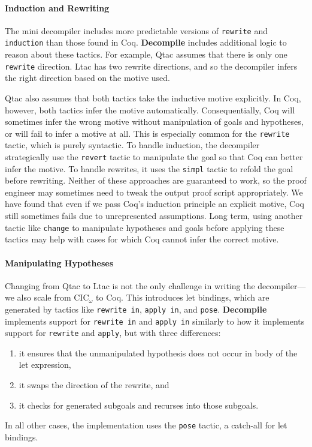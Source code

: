 \paragraph{Induction and Rewriting}
The mini decompiler includes more predictable versions of \lstinline{rewrite} and \lstinline{induction}
than those found in Coq. \textbf{Decompile} includes additional logic to reason about these tactics.
For example, Qtac assumes that there is only one \lstinline{rewrite} direction. Ltac has two rewrite directions,
and so the decompiler infers the right direction based on the motive used.

Qtac also assumes that both tactics take the inductive motive explicitly.
In Coq, however, both tactics infer the motive automatically.
Consequentially, Coq will sometimes infer the wrong motive without manipulation of goals and hypotheses,
or will fail to infer a motive at all.
This is especially common for the \lstinline{rewrite} tactic, which is purely syntactic.
To handle induction, the decompiler strategically use the \lstinline{revert} tactic to manipulate the goal
so that Coq can better infer the motive.
To handle rewrites, it uses the \lstinline{simpl} tactic to refold the goal before rewriting.
Neither of these approaches are guaranteed to work, so the proof engineer may sometimes need to tweak the output proof script appropriately.
We have found that even if we pass Coq's induction principle an explicit motive, Coq still sometimes fails due
to unrepresented assumptions.
Long term, using another tactic like \lstinline{change} to manipulate hypotheses and goals before applying these tactics
may help with cases for which Coq cannot infer the correct motive.

\paragraph{Manipulating Hypotheses}
Changing from Qtac to Ltac is not the only challenge in writing the decompiler---we also scale from CIC$_{\omega}$ to Coq.
This introduces let bindings, which are generated by tactics like \lstinline{rewrite in}, \lstinline{apply in}, and \lstinline{pose}.
\textbf{Decompile} implements support for \lstinline{rewrite in} and \lstinline{apply in} similarly to how it implements support for
\lstinline{rewrite} and \lstinline{apply}, but with three differences:

\begin{enumerate}
\item it ensures that the unmanipulated hypothesis does not occur in body of the let expression,
\item it swaps the direction of the rewrite, and
\item it checks for generated subgoals and recurses into those subgoals.
\end{enumerate}
In all other cases, the implementation uses the \lstinline{pose} tactic, a catch-all for let bindings.

